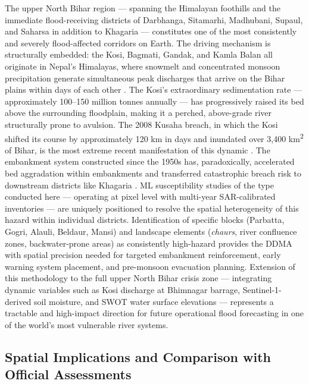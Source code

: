 \documentclass[12pt, a4paper]{article}
\begin{document}
The upper North Bihar region --- spanning the Himalayan foothills and the immediate flood-receiving districts of Darbhanga, Sitamarhi, Madhubani, Supaul, and Saharsa in addition to Khagaria --- constitutes one of the most consistently and severely flood-affected corridors on Earth. The driving mechanism is structurally embedded: the Kosi, Bagmati, Gandak, and Kamla Balan all originate in Nepal's Himalayas, where snowmelt and concentrated monsoon precipitation generate simultaneous peak discharges that arrive on the Bihar plains within days of each other \citep{sinha2008, mishra2018, Jha2012, Costache2021Geocarto}. The Kosi's extraordinary sedimentation rate --- approximately 100--150 million tonnes annually \citep{sinha2008} --- has progressively raised its bed above the surrounding floodplain, making it a perched, above-grade river structurally prone to avulsion. The 2008 Kusaha breach, in which the Kosi shifted its course by approximately 120 km in days and inundated over 3,400 km\textsuperscript{2} of Bihar, is the most extreme recent manifestation of this dynamic \citep{bhuvan2010, mishra2018}. The embankment system constructed since the 1950s has, paradoxically, accelerated bed aggradation within embankments and transferred catastrophic breach risk to downstream districts like Khagaria \citep{beams2024, mishra2018}. ML susceptibility studies of the type conducted here --- operating at pixel level with multi-year SAR-calibrated inventories --- are uniquely positioned to resolve the spatial heterogeneity of this hazard within individual districts. Identification of specific blocks (Parbatta, Gogri, Alauli, Beldaur, Mansi) and landscape elements (\textit{chaurs}, river confluence zones, backwater-prone areas) as consistently high-hazard provides the DDMA with spatial precision needed for targeted embankment reinforcement, early warning system placement, and pre-monsoon evacuation planning. Extension of this methodology to the full upper North Bihar crisis zone --- integrating dynamic variables such as Kosi discharge at Bhimnagar barrage, Sentinel-1-derived soil moisture, and SWOT water surface elevations \citep{Biancamaria2016} --- represents a tractable and high-impact direction for future operational flood forecasting in one of the world's most vulnerable river systems.

\subsection{Spatial Implications and Comparison with Official Assessments}
\end{document}
